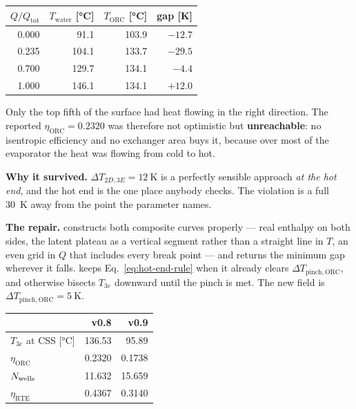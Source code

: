 \begin{center}
\begin{tabular}{@{}r r r r@{}}
\toprule
$Q/Q_{\mathrm{tot}}$ & $T_{\mathrm{water}}$ [\si{\celsius}]
 & $T_{\mathrm{ORC}}$ [\si{\celsius}] & gap [\si{\kelvin}] \\
\midrule
0.000 &  91.1 & 103.9 & $-12.7$ \\
0.235 & 104.1 & 133.7 & $\mathbf{-29.5}$ \\
0.700 & 129.7 & 134.1 & $-4.4$ \\
1.000 & 146.1 & 134.1 & $+12.0$ \\
\bottomrule
\end{tabular}
\end{center}

\noindent
Only the top fifth of the surface had heat flowing in the right direction. The
reported $\eta_{\mathrm{ORC}}=0.2320$ was therefore not optimistic but
\textbf{unreachable}: no isentropic efficiency and no exchanger area buys it,
because over most of the evaporator the heat was flowing from cold to hot.

\medskip
\noindent\textbf{Why it survived.} $\Delta T_{2D,3E}=\SI{12}{\kelvin}$ is a
perfectly sensible approach \emph{at the hot end}, and the hot end is the one
place anybody checks. The violation is a full \SI{30}{\kelvin} away from the
point the parameter names.

\medskip
\noindent\textbf{The repair.}  constructs both composite curves
properly --- real enthalpy on both sides, the latent plateau as a vertical
segment rather than a straight line in $T$, an even grid in $Q$ that includes
every break point --- and returns the minimum gap wherever it falls.
 keeps Eq.~\eqref{eq:hot-end-rule} when it already
clears $\Delta T_{\mathrm{pinch,ORC}}$, and otherwise bisects $T_{3e}$ downward
until the pinch is met. The new field is
$\Delta T_{\mathrm{pinch,ORC}}=\SI{5}{\kelvin}$.

\begin{center}
\begin{tabular}{@{}l r r@{}}
\toprule
 & v0.8 & v0.9 \\
\midrule
$T_{3e}$ at CSS [\si{\celsius}] & 136.53 & 95.89 \\
$\eta_{\mathrm{ORC}}$           & 0.2320 & 0.1738 \\
$N_{\mathrm{wells}}$                       & 11.632 & 15.659 \\
$\eta_{\mathrm{RTE}}$           & 0.4367 & 0.3140 \\
\bottomrule
\end{tabular}
\end{center}

